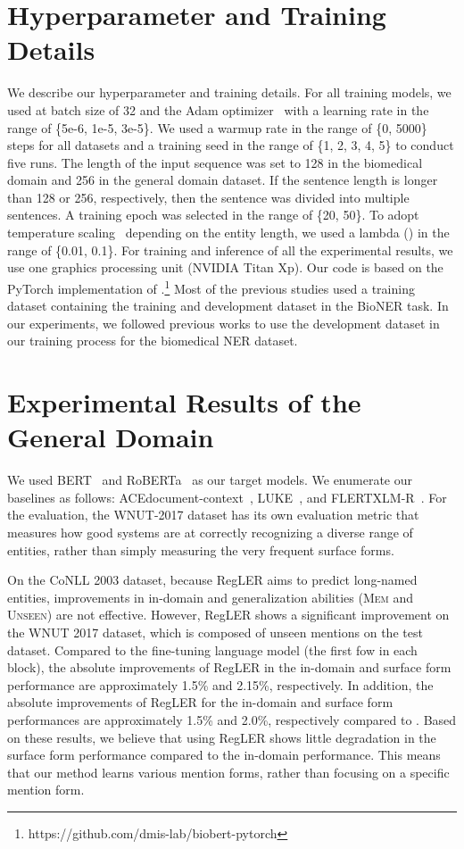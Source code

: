 \documentclass[11pt]{article}
\begin{document}
\section{Hyperparameter and Training Details}
\label{app:hyperparameter}
We describe our hyperparameter and training details.
For all training models, we used at batch size of 32 and the Adam optimizer~\cite{kingma2014adam} with a learning rate in the range of \{5e-6, 1e-5, 3e-5\}.
We used a warmup rate in the range of \{0, 5000\} steps for all datasets and a training seed in the range of \{1, 2, 3, 4, 5\} to conduct five runs.
The length of the input sequence was set to 128 in the biomedical domain and 256 in the general domain dataset. 
If the sentence length is longer than 128 or 256, respectively, then the sentence was divided into multiple sentences.
A training epoch was selected in the range of \{20, 50\}.
To adopt temperature scaling~\cite{guo2017calibration} depending on the entity length, we used a lambda () in the range of \{0.01, 0.1\}. 
For training and inference of all the experimental results, we use one graphics processing unit (NVIDIA Titan Xp).
Our code is based on the PyTorch implementation of \cite{lee2020biobert}.\footnote{https://github.com/dmis-lab/biobert-pytorch}
Most of the previous studies used a training dataset containing the training and development dataset in the BioNER task. 
In our experiments, we followed previous works to use the development dataset in our training process for the biomedical NER dataset.

\section{Experimental Results of the General Domain}
\label{app:general domain}

We used BERT~\cite{devlin2019bert} and RoBERTa~\cite{liu2019roberta} as our target models.
We enumerate our baselines as follows:
ACEdocument-context~\cite{wang2020automated}, LUKE~\cite{yamada2020luke}, and FLERTXLM-R~\cite{schweter2020flert}.
For the evaluation, the WNUT-2017 dataset has its own evaluation metric that measures how good systems are at correctly recognizing a diverse range of entities, rather than simply measuring the very frequent surface forms.

On the CoNLL 2003 dataset, because RegLER aims to predict long-named entities, improvements in in-domain and generalization abilities (\textsc{Mem} and \textsc{Unseen}) are not effective.
However, RegLER shows a significant improvement on the WNUT 2017 dataset, which is composed of unseen mentions on the test dataset.
Compared to the fine-tuning language model (the first fow in each block), the absolute improvements of RegLER in the in-domain and surface form performance are approximately 1.5\% and 2.15\%, respectively.
In addition, the absolute improvements of RegLER for the in-domain and surface form performances are approximately 1.5\% and 2.0\%, respectively compared to \cite{kim2021your}. 
Based on these results, we believe that using RegLER shows little degradation in the surface form performance compared to the in-domain performance.
This means that our method learns various mention forms, rather than focusing on a specific mention form.
\end{document}

